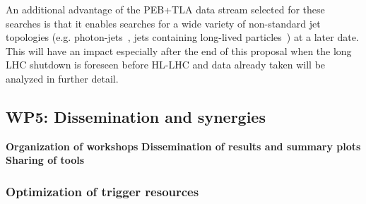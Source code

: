 An additional advantage of the PEB+TLA data stream selected for these searches is that it enables searches for a wide variety of non-standard jet topologies (e.g. photon-jets~\cite{PhotonJets}, jets containing long-lived particles~\cite{PhotonJets}) at a later date. 
This will have an impact especially after the end of this proposal when the long LHC shutdown is foreseen before HL-LHC and data already taken will be analyzed in further detail. 


\subsection{WP5: Dissemination and synergies}
\textbf{Organization of workshops} 
\textbf{Dissemination of results and summary plots} 
\textbf{Sharing of tools} 


\clearpage
\begingroup

    \linespread{0.9}\selectfont

\endgroup
  








\subsubsection{Optimization of trigger resources}

